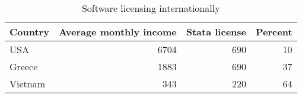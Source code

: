 \begin{table}[h]
\centering
\caption{Software licensing internationally} 
\begin{tabular}{lrrr}
  \toprule
Country & Average monthly income & Stata license & Percent \\ 
  \midrule
USA & 6704 & 690 & 10 \\ 
  Greece & 1883 & 690 & 37 \\ 
  Vietnam & 343 & 220 & 64 \\ 
   \bottomrule
\end{tabular}
\end{table}
